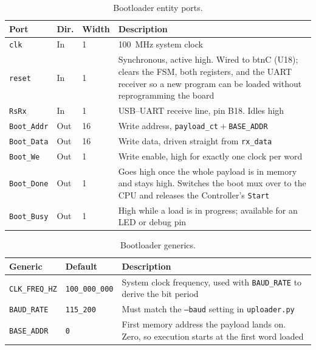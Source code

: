 \documentclass[11pt,letterpaper]{article}
\begin{document}
\begin{table}[H]
  \centering
  \small
  \begin{tabular}{@{}lllp{}@{}}
    \toprule
    \textbf{Port} & \textbf{Dir.} & \textbf{Width} & \textbf{Description} \\
    \midrule
    \texttt{clk}        & In  & 1  & 100~MHz system clock \\
    \texttt{reset}      & In  & 1  & Synchronous, active high. Wired to btnC (U18); clears the FSM, both registers, and the UART receiver so a new program can be loaded without reprogramming the board \\
    \texttt{RsRx}       & In  & 1  & USB--UART receive line, pin B18. Idles high \\
    \midrule
    \texttt{Boot\_Addr} & Out & 16 & Write address, \texttt{payload\_ct}${}+{}$\texttt{BASE\_ADDR} \\
    \texttt{Boot\_Data} & Out & 16 & Write data, driven straight from \texttt{rx\_data} \\
    \texttt{Boot\_We}   & Out & 1  & Write enable, high for exactly one clock per word \\
    \texttt{Boot\_Done} & Out & 1  & Goes high once the whole payload is in memory and stays high. Switches the boot mux over to the CPU and releases the Controller's \texttt{Start} \\
    \texttt{Boot\_Busy} & Out & 1  & High while a load is in progress; available for an LED or debug pin \\
    \bottomrule
  \end{tabular}
  \caption{Bootloader entity ports.}
\end{table}

\begin{table}[H]
  \centering
  \small
  \begin{tabular}{@{}llp{}@{}}
    \toprule
    \textbf{Generic} & \textbf{Default} & \textbf{Description} \\
    \midrule
    \texttt{CLK\_FREQ\_HZ} & \texttt{100\_000\_000} & System clock frequency, used with \texttt{BAUD\_RATE} to derive the bit period \\
    \texttt{BAUD\_RATE}    & \texttt{115\_200}      & Must match the \texttt{--baud} setting in \texttt{uploader.py} \\
    \texttt{BASE\_ADDR}    & \texttt{0}             & First memory address the payload lands on. Zero, so execution starts at the first word loaded \\
    \bottomrule
  \end{tabular}
  \caption{Bootloader generics.}
\end{table}
\end{document}
